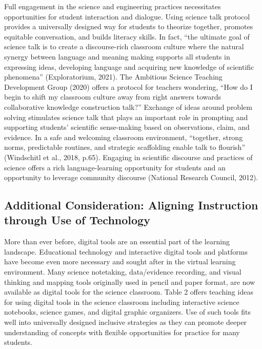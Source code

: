 \documentclass[11.5pt]{sig-alternate}
\begin{document}
\begin{large}
Full engagement in the science and engineering practices necessitates opportunities for student interaction and dialogue. Using science talk protocol provides a universally designed way for students to theorize together, promotes equitable conversation, and builds literacy skills. In fact, “the ultimate goal of science talk is to create a discourse-rich classroom culture where the natural synergy between language and meaning making supports all students in expressing ideas, developing language and acquiring new knowledge of scientific phenomena” (Exploratorium, 2021). The Ambitious Science Teaching Development Group (2020) offers a protocol for teachers wondering, “How do I begin to shift my classroom culture away from right answers towards collaborative knowledge construction talk?” Exchange of ideas around problem solving stimulates science talk that plays an important role in prompting and supporting students' scientific sense-making based on observations, claim, and evidence. In a safe and welcoming classroom environment, “together, strong norms, predictable routines, and strategic scaffolding enable talk to flourish” (Windschitl et al., 2018, p.65). Engaging in scientific discourse and practices of science offers a rich language-learning opportunity for students and an opportunity to leverage community discourse (National Research Council, 2012).

\subsection*{Additional Consideration: Aligning Instruction through Use of Technology}

More than ever before, digital tools are an essential part of the learning landscape. Educational technology and interactive digital tools and platforms have become even more necessary and sought after in the virtual learning environment. Many science notetaking, data/evidence recording, and visual thinking and mapping tools originally used in pencil and paper format, are now available as digital tools for the science classroom. Table 2 offers teaching ideas for using digital tools in the science classroom including interactive science notebooks, science games, and digital graphic organizers. Use of such tools fits well into universally designed inclusive strategies as they can promote deeper understanding of concepts with flexible opportunities for practice for many students. 


\end{large}
\end{document}
